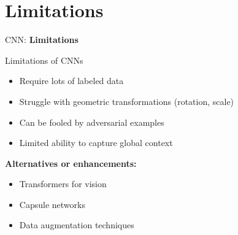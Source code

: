 \section{Limitations}
\begin{frame}{}
    \LARGE CNN: \textbf{Limitations}
\end{frame}

\begin{frame}{Limitations of CNNs}
    \begin{itemize}
        \item Require lots of labeled data
        \item Struggle with geometric transformations (rotation, scale)
        \item Can be fooled by adversarial examples
        \item Limited ability to capture global context
    \end{itemize}
    \vspace{1em}
    \textbf{Alternatives or enhancements:}
    \begin{itemize}
        \item Transformers for vision
        \item Capsule networks
        \item Data augmentation techniques
    \end{itemize}
\end{frame}